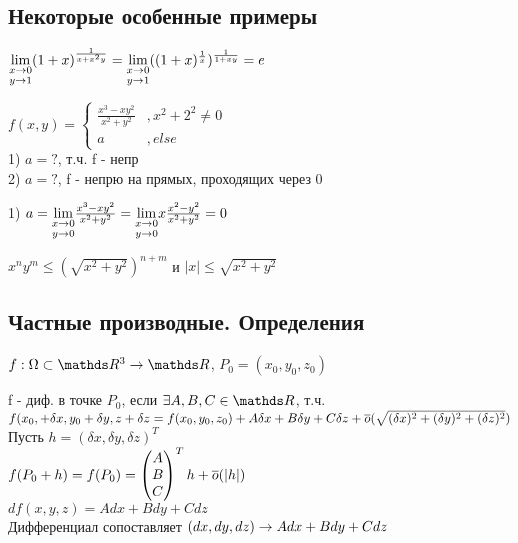 \documentclass[main]{subfiles}
\begin{document}
  \subsection{Некоторые особенные примеры}
  \begin{example}
      $\underset{y \rightarrow 1}{\lim\limits_{x \rightarrow 0}} (1+x)^{\frac{1}{x+x^2 y}}=\underset{y \rightarrow 1}{\lim\limits_{x \rightarrow 0}} ((1+x)^{\frac{1}{x}})^{\frac{1}{1+x y}}=e$
  \end{example}

  \begin{example}
      $f(x,y)=\begin{cases} \frac{x^3-xy^2}{x^2+y^2} &,x^2+2^2 \neq 0\\ a & , else \end{cases}$\\
      1) $a=?$, т.ч. f - непр\\
      2) $a=?$, f - непрю на прямых, проходящих через 0\\
  \end{example}

  \begin{sol}
      1) $a=\underset{y \rightarrow 0}{\lim\limits_{x \rightarrow 0}} \frac{x^3-x y^2}{x^2+y^2}=\underset{y \rightarrow 0}{\lim\limits_{x \rightarrow 0}} x \frac{x^2-y^2}{x^2+y^2}=0$
  \end{sol}

  \begin{remark}
      $x^n y^m \leqslant (\sqrt{x^2+y^2})^{n+m}$ и $|x| \leqslant \sqrt{x^2+y^2}$
  \end{remark}

  \subsection{Частные производные. Определения}
  $f: \Omega \subset \R^3 \ra \R$, $P_0=(x_0,y_0,z_0)$
  \begin{definition}
      f - диф. в точке $P_0$, если $\e A,B,C \in \R$, т.ч.\\
      $f(x_0,+\delta x, y_0 + \delta y, z+\delta z =f(x_0,y_0,z_0)+A \delta x+ B \delta y + C \delta z+\overline{o} (\sqrt{(\delta x)^2+(\delta y)^2+ (\delta z)^2})$\\
      Пусть $h=(\delta x, \delta y, \delta z)^T$\\
      $f(P_0+h)=f(P_0)=\begin{pmatrix} A\\ B\\ C \end{pmatrix}^T h + \overline{o}(|h|)$\\
      $df(x,y,z)=A dx+B dy+C dz$\\
      Дифференциал сопоставляет $(dx, dy, dz) \rightarrow A dx+B dy+C dz$
  \end{definition}
\end{document}
